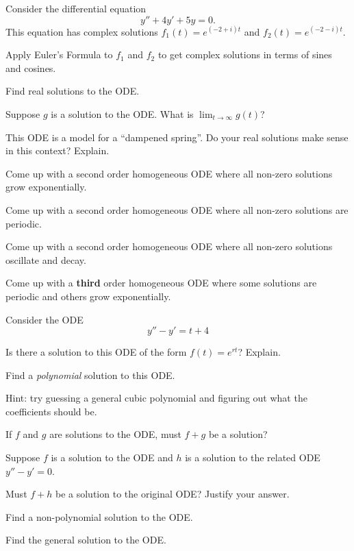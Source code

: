 \documentclass{workbook}
\begin{document}
\begin{slide}
	\question
	Consider the differential equation
	\[
		y''+4y'+5y=0.
	\]
	This equation has complex solutions $f_1(t)=e^{(-2+i)t}$
	and $f_2(t)=e^{(-2-i)t}$.

	\begin{parts}
		\item Apply Euler's Formula to $f_1$ and $f_2$ to get complex solutions in terms of sines and cosines.
		\item Find real solutions to the ODE.
		\item Suppose $g$ is a solution to the ODE. What is $\displaystyle 
		\lim_{t\to\infty} g(t)$?
		\item This ODE is a model for a ``dampened spring''. Do your
		real solutions make sense in this context? Explain.
	\end{parts}
\end{slide}


\begin{slide}
	\question

	\begin{parts}
		\item Come up with a second order homogeneous ODE where all non-zero solutions 	grow exponentially.
		\item Come up with a second order homogeneous ODE where all non-zero solutions are periodic.
		\item Come up with a second order homogeneous ODE where all non-zero solutions oscillate and decay.
		\item Come up with a \textbf{third} order homogeneous ODE where some solutions are periodic and others grow exponentially.
		
	\end{parts}
\end{slide}

\begin{slide}
	\question
	Consider the ODE
	\[
		y''-y'=t+4
	\]


	\begin{parts}
		\item Is there a solution to this ODE of the form $f(t)=e^{rt}$? Explain.
		\item Find a \emph{polynomial} solution to this ODE.

		Hint: try guessing a general cubic polynomial and figuring out what the coefficients should be.

		\item If $f$ and $g$ are solutions to the ODE, must $f+g$ be a solution?
		
		\item Suppose $f$ is a solution to the ODE and $h$ is a solution to the
		related ODE $y''-y'=0$.

		Must $f+h$ be a solution to the original ODE? Justify your answer.

		\item Find a non-polynomial solution to the ODE.

		\item Find the general solution to the ODE.
	\end{parts}
\end{slide}
\end{document}

